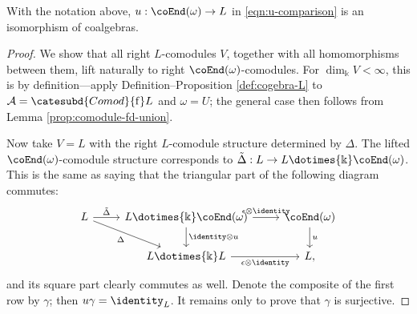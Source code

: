\begin{lemma}\label{prop:reconstruction-cat-aux}
	With the notation above, $u: \coEnd(\omega) \to L$ in
	\eqref{eqn:u-comparison} is an isomorphism of coalgebras.
\end{lemma}
\begin{proof}
	We show that all right $L$-comodules $V$, together with all homomorphisms
	between them, lift naturally to right $\coEnd(\omega)$-comodules. For
	$\dim_{\Bbbk} V < \infty$, this is by definition---apply
	Definition--Proposition \ref{def:cogebra-L} to
	$\mathcal{A} = \catesubd{Comod}{\mathrm{f}}L$ and $\omega = U$; the
	general case then follows from Lemma \ref{prop:comodule-fd-union}.
	
	Now take $V=L$ with the right $L$-comodule structure determined by
	$\Delta$. The lifted $\coEnd(\omega)$-comodule structure corresponds to
	$\tilde{\Delta}: L \to L \dotimes{\Bbbk} \coEnd(\omega)$. This is the
	same as saying that the triangular part of the following diagram
	commutes:
	\[\begin{tikzcd}
		L \arrow[r, "{\tilde{\Delta}}"] \arrow[rd, "\Delta"'] & L \dotimes{\Bbbk} \coEnd(\omega) \arrow[r, "{\epsilon \otimes \identity}"] \arrow[d, "{\identity \otimes u}"] & \coEnd(\omega) \arrow[d, "u"] \\
		& L \dotimes{\Bbbk} L \arrow[r, "{\epsilon \otimes \identity}"'] & L,
	\end{tikzcd}\]
	and its square part clearly commutes as well. Denote the composite of the
	first row by $\gamma$; then $u\gamma = \identity_L$. It remains only to
	prove that $\gamma$ is surjective.
	

\end{proof}
